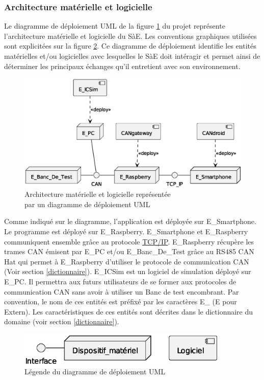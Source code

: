 \subsubsection{Architecture matérielle et logicielle}
Le diagramme de déploiement UML de la figure \ref{schema_arch_mat} du projet représente l'architecture matérielle et logicielle du SàE. Les conventions graphiques utilisées sont explicitées sur la figure \ref{schema_legende_diag_deploiment}. Ce diagramme de déploiement identifie les entités matérielles et/ou logicielles avec lesquelles le SàE doit intéragir et permet ainsi de déterminer les principaux échanges qu'il entretient avec son environnement. 
\begin{figure}[ht] 
    \centering
    \includegraphics[width=14cm]{../schemas/arch_mat}
    \captionsetup{justification=centering}
    \caption{Architecture matérielle et logicielle représentée \\par un diagramme de déploiement UML}
    \label{schema_arch_mat}
\end{figure}

Comme indiqué sur le diagramme, l'application {\nomApplication} est déployée sur E\_Smartphone. Le programme {\nomLogiciel} est déployé sur E\_Raspberry. E\_Smartphone et E\_Raspberry communiquent ensemble grâce au protocole \hyperref[tcp_ip]{TCP/IP}. E\_Raspberry récupère les trames CAN émisent par E\_PC et/ou E\_Banc\_De\_Test grâce au RS485 CAN Hat qui permet à E\_Raspberry d'utiliser le protocole de communication CAN (Voir section \ref{dictionnaire}). E\_ICSim est un logiciel de simulation déployé sur E\_PC. Il permettra aux futurs utilisateurs de se former aux protocoles de communication CAN sans avoir à utiliser un Banc de test encombrant. Par convention, le nom de ces entités est préfixé par les caractères {\guillemotleft} E\_ {\guillemotright} (E pour Extern). Les caractéristiques de ces entités sont décrites dans le dictionnaire du domaine (voir section \ref{dictionnaire}).
\begin{figure}[ht] 
    \centering
    \includegraphics[width=10cm]{../schemas/legende_diag_deploiement}
    \caption{Légende du diagramme de déploiement UML}
    \label{schema_legende_diag_deploiment}
\end{figure}

\bigskip